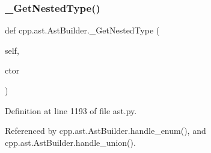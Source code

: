 \subsubsection{\texorpdfstring{\+\_\+\+Get\+Nested\+Type()}{\_GetNestedType()}}
{\footnotesize\ttfamily def cpp.\+ast.\+Ast\+Builder.\+\_\+\+Get\+Nested\+Type (\begin{DoxyParamCaption}\item[{}]{self,  }\item[{}]{ctor }\end{DoxyParamCaption})\hspace{0.3cm}{\ttfamily [private]}}



Definition at line 1193 of file ast.\+py.



Referenced by cpp.\+ast.\+Ast\+Builder.\+handle\+\_\+enum(), and cpp.\+ast.\+Ast\+Builder.\+handle\+\_\+union().


